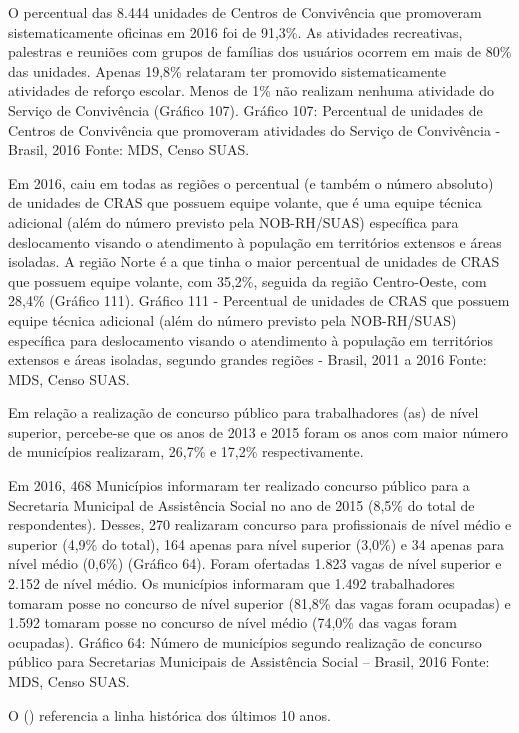 \documentclass[
  brazilian]{report}
\begin{document}
O percentual das 8.444 unidades de Centros de Convivência que promoveram
sistematicamente oficinas em 2016 foi de 91,3\%. As atividades
recreativas, palestras e reuniões com grupos de famílias dos usuários
ocorrem em mais de 80\% das unidades. Apenas 19,8\% relataram ter
promovido sistematicamente atividades de reforço escolar. Menos de 1\%
não realizam nenhuma atividade do Serviço de Convivência (Gráfico 107).
Gráfico 107: Percentual de unidades de Centros de Convivência que
promoveram atividades do Serviço de Convivência - Brasil, 2016 Fonte:
MDS, Censo SUAS.

Em 2016, caiu em todas as regiões o percentual (e também o número
absoluto) de unidades de CRAS que possuem equipe volante, que é uma
equipe técnica adicional (além do número previsto pela NOB-RH/SUAS)
específica para deslocamento visando o atendimento à população em
territórios extensos e áreas isoladas. A região Norte é a que tinha o
maior percentual de unidades de CRAS que possuem equipe volante, com
35,2\%, seguida da região Centro-Oeste, com 28,4\% (Gráfico 111).
Gráfico 111 - Percentual de unidades de CRAS que possuem equipe técnica
adicional (além do número previsto pela NOB-RH/SUAS) específica para
deslocamento visando o atendimento à população em territórios extensos e
áreas isoladas, segundo grandes regiões - Brasil, 2011 a 2016 Fonte:
MDS, Censo SUAS.

Em relação a realização de concurso público para trabalhadores (as) de
nível superior, percebe-se que os anos de 2013 e 2015 foram os anos com
maior número de municípios realizaram, 26,7\% e 17,2\% respectivamente.

Em 2016, 468 Municípios informaram ter realizado concurso público para a
Secretaria Municipal de Assistência Social no ano de 2015 (8,5\% do
total de respondentes). Desses, 270 realizaram concurso para
profissionais de nível médio e superior (4,9\% do total), 164 apenas
para nível superior (3,0\%) e 34 apenas para nível médio (0,6\%)
(Gráfico 64). Foram ofertadas 1.823 vagas de nível superior e 2.152 de
nível médio. Os municípios informaram que 1.492 trabalhadores tomaram
posse no concurso de nível superior (81,8\% das vagas foram ocupadas) e
1.592 tomaram posse no concurso de nível médio (74,0\% das vagas foram
ocupadas). Gráfico 64: Número de municípios segundo realização de
concurso público para Secretarias Municipais de Assistência Social --
Brasil, 2016 Fonte: MDS, Censo SUAS.

O () referencia a linha histórica dos últimos 10
anos.
\end{document}
